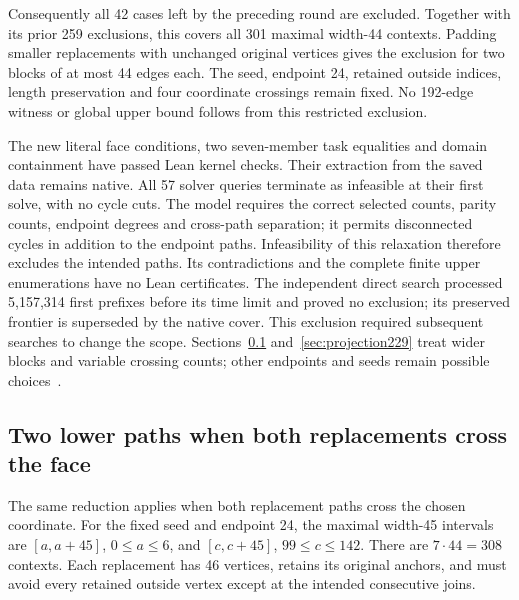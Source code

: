 \documentclass[11pt,a4paper]{article}
\theoremstyle{definition}
\theoremstyle{remark}
\begin{document}
Consequently all 42 cases left by the preceding round are excluded.
Together with its prior 259 exclusions, this covers all 301 maximal
width-44 contexts. Padding smaller replacements with unchanged original
vertices gives the exclusion for two blocks of at most 44 edges each.
The seed, endpoint 24, retained outside indices, length preservation and
four coordinate crossings remain fixed. No 192-edge witness or global
upper bound follows from this restricted exclusion.

The new literal face conditions, two seven-member task equalities and
domain containment have passed Lean kernel checks. Their extraction from
the saved data remains native. All 57 solver queries terminate as
infeasible at their first solve, with no cycle cuts. The model requires
the correct selected counts, parity counts, endpoint degrees and
cross-path separation; it permits disconnected cycles in addition to
the endpoint paths. Infeasibility of this relaxation therefore excludes
the intended paths. Its contradictions and the complete finite upper
enumerations have no Lean certificates. The independent direct search
processed 5,157,314 first prefixes before its time limit and proved no
exclusion; its preserved frontier is superseded by the native cover.
This exclusion required subsequent searches to change the scope.
Sections~\ref{sec:width45} and~\ref{sec:projection229} treat wider blocks
and variable crossing counts; other endpoints and seeds remain possible
choices~\cite{research227}.

\subsection{Two lower paths when both replacements cross the face}
\label{sec:width45}
The same reduction applies when both replacement paths cross the chosen
coordinate. For the fixed seed and endpoint 24, the maximal width-45
intervals are $[a,a+45]$, $0\le a\le6$, and $[c,c+45]$,
$99\le c\le142$. There are $7\cdot44=308$ contexts. Each replacement
has 46 vertices, retains its original anchors, and must avoid every
retained outside vertex except at the intended consecutive joins.
\end{document}
